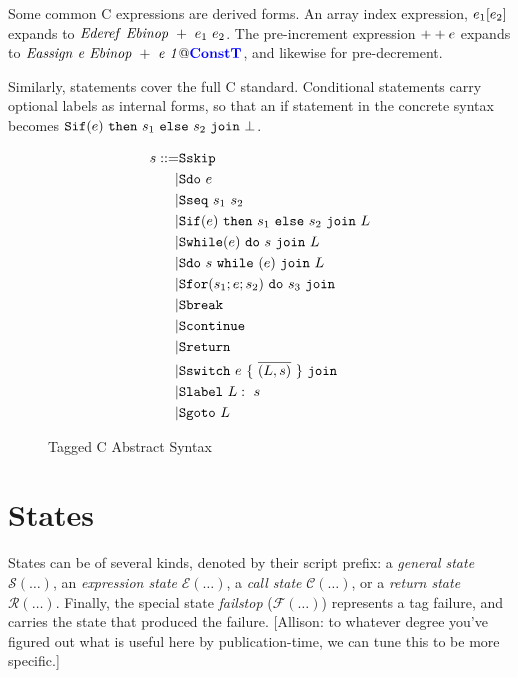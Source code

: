 \documentclass{llncs}
\begin{document}
Some common C expressions are derived forms. An array index expression,
\(e_1[e_2]\) expands to \(\mathit{Ederef} ~ \mathit{Ebinop} ~ + ~ e_1 ~ e_2\).
The pre-increment  expression \(++e\) expands to
\(\mathit{Eassign ~ e ~ \mathit{Ebinop} ~ + ~ e ~ 1@\color{blue} \mathbf{ConstT}}\), and likewise for pre-decrement.

Similarly, statements cover the full C standard. Conditional statements
carry optional labels as internal forms, so that an if statement in the
concrete syntax becomes \(\mathtt{Sif}(e) ~ \mathtt{then} ~ s_1 ~ \mathtt{else} ~ s_2 ~ \mathtt{join} ~ \bot\).

\begin{figure}
  \begin{subfigure}[t]{0.3\textwidth}
    \[\begin{aligned}
    s ::= & \mathtt{Sskip} \\
    | & \mathtt{Sdo} ~ e \\
    | & \mathtt{Sseq} ~ s_1 ~ s_2 \\
    | & \mathtt{Sif}(e) ~ \mathtt{then} ~ s_1 ~ \mathtt{else} ~ s_2 ~ \mathtt{join} ~ L \\
    | & \mathtt{Swhile}(e) ~ \mathtt{do} ~ s ~ \mathtt{join} ~ L \\
    | & \mathtt{Sdo} ~ s ~ \mathtt{while} ~ (e) ~ \mathtt{join} ~ L \\
    | & \mathtt{Sfor}(s_1; e; s_2) ~ \mathtt{do} ~ s_3 ~ \mathtt{join} ~ \\
    | & \mathtt{Sbreak} \\
    | & \mathtt{Scontinue} \\
    | & \mathtt{Sreturn} ~ \\
    | & \mathtt{Sswitch} ~ e ~ \{ ~ \overline{(L,s)} ~ \} ~ \mathtt{join} ~ \\
    | & \mathtt{Slabel} ~ L: ~ s \\
    | & \mathtt{Sgoto} ~ L \\    
    \end{aligned}\]
  \end{subfigure}
  \begin{subfigure}[t]{0.69\textwidth}
  \end{subfigure}
  \caption{Tagged C Abstract Syntax}
  \label{fig:syntax}
\end{figure}

\section{States}

States can be of several kinds, denoted by their script prefix: a {\em general state} \(\mathcal{S}(\dots)\),
an {\em expression state} \(\mathcal{E}(\dots)\), a {\em call state} \(\mathcal{C}(\dots)\), or a
{\em return state} \(\mathcal{R}(\dots)\). Finally, the special state {\em failstop} (\(\mathcal{F}(\dots)\))
represents a tag failure, and carries the state that produced the failure.
[Allison: to whatever degree you've figured out what is useful here by publication-time, we can
  tune this to be more specific.]
\end{document}
